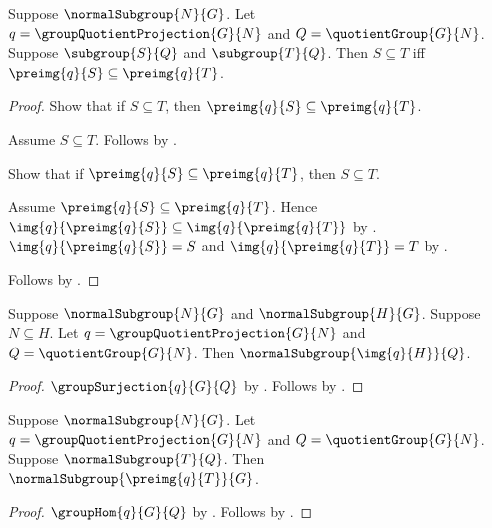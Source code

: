 \begin{theorem}\label{group_quotient_correspondence_preimage_inclusion}
    Suppose $\normalSubgroup{N}{G}$.
    Let $q=\groupQuotientProjection{G}{N}$ and
        $Q=\quotientGroup{G}{N}$.
    Suppose $\subgroup{S}{Q}$ and $\subgroup{T}{Q}$.
    Then $S\subseteq T$ iff
        $\preimg{q}{S}\subseteq\preimg{q}{T}$.
\end{theorem}
\begin{proof}
    Show that if $S\subseteq T$, then
        $\preimg{q}{S}\subseteq\preimg{q}{T}$.
    \begin{subproof}
        Assume $S\subseteq T$.
        Follows by .
    \end{subproof}
    Show that if $\preimg{q}{S}\subseteq\preimg{q}{T}$, then
        $S\subseteq T$.
    \begin{subproof}
        Assume $\preimg{q}{S}\subseteq\preimg{q}{T}$.
        Hence $\img{q}{\preimg{q}{S}}\subseteq
            \img{q}{\preimg{q}{T}}$ by .
        $\img{q}{\preimg{q}{S}}=S$ and
            $\img{q}{\preimg{q}{T}}=T$ by
            .
    \end{subproof}
    Follows by \auto.
\end{proof}

\begin{theorem}\label{group_quotient_correspondence_normal_image}
    Suppose $\normalSubgroup{N}{G}$ and $\normalSubgroup{H}{G}$.
    Suppose $N\subseteq H$.
    Let $q=\groupQuotientProjection{G}{N}$ and
        $Q=\quotientGroup{G}{N}$.
    Then $\normalSubgroup{\img{q}{H}}{Q}$.
\end{theorem}
\begin{proof}
    $\groupSurjection{q}{G}{Q}$ by
        .
    Follows by .
\end{proof}

\begin{theorem}\label{group_quotient_correspondence_normal_preimage}
    Suppose $\normalSubgroup{N}{G}$.
    Let $q=\groupQuotientProjection{G}{N}$ and
        $Q=\quotientGroup{G}{N}$.
    Suppose $\normalSubgroup{T}{Q}$.
    Then $\normalSubgroup{\preimg{q}{T}}{G}$.
\end{theorem}
\begin{proof}
    $\groupHom{q}{G}{Q}$ by
        .
    Follows by .
\end{proof}

